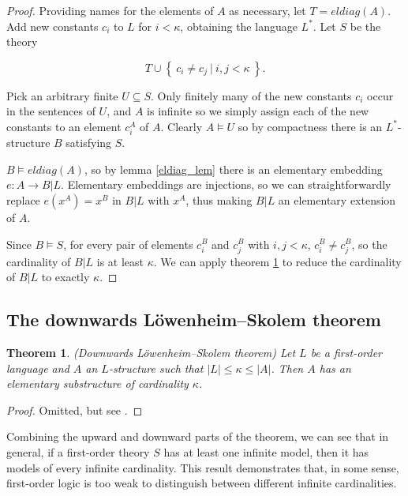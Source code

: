 \documentclass[10pt, a4paper, oneside]{article}
\newtheorem{thm}{Theorem}[section]
\theoremstyle{definition}
\theoremstyle{remark}
\theoremstyle{plain}
\theoremstyle{plain}
\begin{document}
\begin{proof}
    Providing names for the elements of $A$ as necessary, let $T = eldiag(A)$.
    Add new constants $c_i$ to $L$ for $i < \kappa$, obtaining the language
    $L^*$. Let $S$ be the theory
    
    \begin{displaymath}
        T \cup \left\{\ c_i \neq c_j\ |\ i, j < \kappa\ \right\}.
    \end{displaymath}
    
    Pick an arbitrary finite $U \subseteq S$. Only finitely many of the new
    constants $c_i$ occur in the sentences of $U$, and $A$ is infinite so we
    simply assign each of the new constants to an element $c^A_i$ of $A$.
    Clearly $A \models U$ so by compactness there is an $L^*$-structure $B$
    satisfying $S$.
    
    $B \models eldiag(A)$, so by lemma \ref{eldiag_lem} there is an elementary
    embedding $e : A \rightarrow B | L$. Elementary embeddings are injections,
    so we can straightforwardly replace $e(x^A) = x^B$ in $B | L$ with $x^A$,
    thus making $B | L$ an elementary extension of $A$.
    
    Since $B \models S$, for every pair of elements $c^B_i$ and $c^B_j$ with
    $i, j < \kappa$, $c^B_i \neq c^B_j$, so the cardinality of $B | L$ is at
    least $\kappa$. We can apply theorem \ref{down_lst} to reduce the
    cardinality of $B | L$ to exactly $\kappa$.
\end{proof}

\subsection{The downwards Löwenheim--Skolem theorem}

\begin{thm}
    \label{down_lst}
    (Downwards Löwenheim--Skolem theorem) Let $L$ be a first-order language
    and $A$ an $L$-structure such that $|L| \leq \kappa \leq |A|$. Then $A$
    has an elementary substructure of cardinality $\kappa$.
\end{thm}

\begin{proof}
    Omitted, but see \citealt[pp. 69--72]{hodges1997}.
\end{proof}

Combining the upward and downward parts of the theorem, we can see that in
general, if a first-order theory $S$ has at least one infinite model, then it
has models of every infinite cardinality. This result demonstrates that, in some
sense, first-order logic is too weak to distinguish between different infinite
cardinalities.
\end{document}
